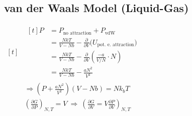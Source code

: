 \documentclass[12pt]{article}
\begin{document}
\subsection{van der Waals Model (Liquid-Gas)}
\vspace{5pt}
\begin{minipage}[t]{.42\textwidth}
    \(\begin{aligned}[t]
        &\begin{aligned}[t]
                P &= P_\text{no attraction} + P_\text{vdW}\\[7pt]
                &= \frac{NkT}{V - Nb} - \frac{\partial}{\partial V} \big( U_\text{pot. e. attraction} \big)\\[5pt]
                &= \frac{NkT}{V - Nb} - \frac{\partial}{\partial V} \left( \frac{-a}{V/N} \cdot N \right)\\[5pt]
                &= \frac{NkT}{V - Nb} - \frac{aN^2}{V^2}
            \end{aligned}\\[3pt]
        &\Rightarrow \boxed{ \left( P + \frac{aN^2}{V^2} \right) \left( V - Nb \right) = Nk_b T }\\[20pt]
        &\left( \tfrac{\partial G}{\partial P} \right)_{N,T} = V \ \Rightarrow \ 
            \boxed{ \left( \tfrac{\partial G}{\partial V} = V \tfrac{\partial P}{\partial V} \right)_{N,T} }
    \end{aligned}\)   
\end{minipage}
\end{document}
